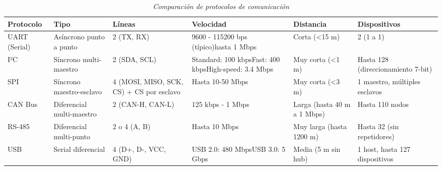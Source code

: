 \begin{table}[H]
\centering
\small
\begin{tabular}{|p{2cm}|p{2.5cm}|p{2cm}|p{2cm}|p{2.5cm}|p{2cm}|}
\hline
\textbf{Protocolo} & \textbf{Tipo} & \textbf{Líneas} & \textbf{Velocidad} & \textbf{Distancia} & \textbf{Dispositivos} \\
\hline
UART (Serial) & Asíncrono punto a punto & 2 (TX, RX) & 9600 - 115200 bps (típico)\newline hasta 1 Mbps & Corta (<15 m) & 2 (1 a 1) \\
\hline
I²C & Síncrono multi-maestro & 2 (SDA, SCL) & Standard: 100 kbps\newline Fast: 400 kbps\newline High-speed: 3.4 Mbps & Muy corta (<1 m) & Hasta 128 (direccionamiento 7-bit) \\
\hline
SPI & Síncrono maestro-esclavo & 4 (MOSI, MISO, SCK, CS) + CS por esclavo & Hasta 10-50 Mbps & Muy corta (<3 m) & 1 maestro, múltiples esclavos \\
\hline
CAN Bus & Diferencial multi-maestro & 2 (CAN-H, CAN-L) & 125 kbps - 1 Mbps & Larga (hasta 40 m a 1 Mbps) & Hasta 110 nodos \\
\hline
RS-485 & Diferencial multi-punto & 2 o 4 (A, B) & Hasta 10 Mbps & Muy larga (hasta 1200 m) & Hasta 32 (sin repetidores) \\
\hline
USB & Serial diferencial & 4 (D+, D-, VCC, GND) & USB 2.0: 480 Mbps\newline USB 3.0: 5 Gbps & Media (5 m sin hub) & 1 host, hasta 127 dispositivos \\
\hline
\end{tabular}
\caption{\textit{Comparación de protocolos de comunicación}}
\label{tab:protocolos_comunicacion}
\end{table}




